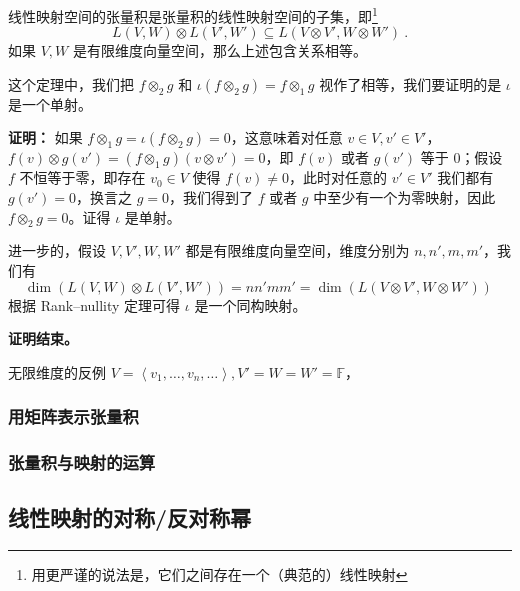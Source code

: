 \begin{theorem}{}
线性映射空间的张量积是张量积的线性映射空间的子集，即\footnote{用更严谨的说法是，它们之间存在一个（典范的）线性映射}
\begin{equation}
L(V, W) \otimes L(V', W') \subseteq L(V \otimes V', W \otimes W')~.
\end{equation}
如果 $V, W$ 是有限维度向量空间，那么上述包含关系相等。
\end{theorem}

这个定理中，我们把 $f \otimes_2 g$ 和 $\iota(f \otimes_2 g) = f \otimes_1 g$ 视作了相等，我们要证明的是 $\iota$ 是一个单射。

\textbf{证明：}
如果 $f \otimes_1 g = \iota(f \otimes_2 g) = 0$，这意味着对任意 $v \in V, v' \in V'$，$f(v) \otimes g(v') = (f \otimes_1 g)(v \otimes v') = 0$，即 $f(v)$ 或者 $g(v')$ 等于 $0$；假设 $f$ 不恒等于零，即存在 $v_0 \in V$ 使得 $f(v) \neq 0$，此时对任意的 $v' \in V'$ 我们都有 $g(v') = 0$，换言之 $g = 0$，我们得到了 $f$ 或者 $g$ 中至少有一个为零映射，因此 $f \otimes_2 g = 0$。证得 $\iota$ 是单射。

进一步的，假设 $V, V', W, W'$ 都是有限维度向量空间，维度分别为 $n, n', m, m'$，我们有
\begin{equation}
\dim(L(V, W) \otimes L(V', W')) = n n' m m' = \dim(L(V \otimes V', W \otimes W'))~
\end{equation}
根据 Rank–nullity 定理可得 $\iota$ 是一个同构映射。

\textbf{证明结束。}

\begin{example}{无限维度的反例}
$V = \left\langle v_1, \dots, v_n, \dots \right\rangle, V' = W = W' = \mathbb{F}$，
\end{example}





\subsubsection{用矩阵表示张量积}


\subsubsection{张量积与映射的运算}



\subsection{线性映射的对称/反对称幂}






